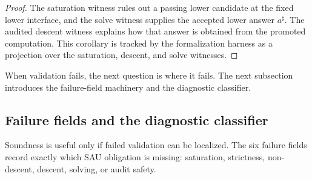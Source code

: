 \documentclass[11pt]{article}
\theoremstyle{definition}
\begin{document}
\begin{proof}
The saturation witness rules out a passing lower candidate at the fixed lower
interface, and the solve witness supplies the accepted lower answer
\(a^\sharp\).  The audited descent witness explains how that answer is obtained
from the promoted computation.  This corollary is tracked by the formalization
harness as a projection over the saturation, descent, and solve witnesses.
\end{proof}

When validation fails, the next question is where it fails.  The next subsection
introduces the failure-field machinery and the diagnostic classifier.

\subsection{Failure fields and the diagnostic classifier}
\label{subsec:soundness-failure-classifier}

Soundness is useful only if failed validation can be localized.  The six failure
fields record exactly which SAU obligation is missing: saturation, strictness,
non-descent, descent, solving, or audit safety.
\end{document}
